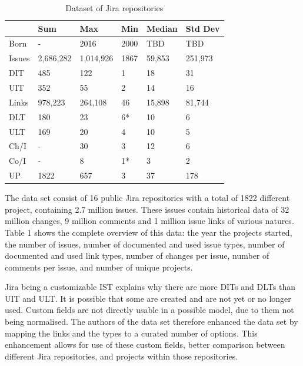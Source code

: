 \documentclass[sigconf]{acmart}
\begin{document}
\begin{table}[h!]
\caption{Dataset of Jira repositories}
\centering
 \begin{tabular}{l l l l l l} 
 \hline
   & Sum & Max & Min & Median & Std Dev \\ [0.5ex] 
 \hline\hline
 Born & - & 2016 & 2000 & TBD & TBD \\
 Issues & 2,686,282 & 1,014,926 & 1867 & 59,853 & 251,973 \\
 DIT & 485 & 122 & 1 & 18 & 31 \\
 UIT & 352 & 55 & 2 & 14 & 16 \\
 Links & 978,223 & 264,108 & 46 & 15,898 & 81,744 \\
 DLT & 180 & 23 & 6* & 10 & 6 \\
 ULT & 169 & 20 & 4 & 10 & 5 \\ 
 Ch/I & - & 30 & 3 & 12 & 6 \\
 Co/I & - & 8 & 1* & 3 & 2 \\
 UP & 1822 & 657 & 3 & 37 & 178 \\ [2ex] 
 \hline
 \end{tabular}
\end{table}

The data set consist of 16 public Jira repositories with a total of 1822 different project, containing 2.7 million issues. 
These issues contain historical data of 32 million changes, 9 million comments and 1 million issue links of various natures. 
Table 1 shows the complete overview of this data: the year the projects started, the number of issues, number of documented and used issue types, number of documented and used link types, number of changes per issue, number of comments per issue, and number of unique projects. 

Jira being a customizable IST explains why there are more DITs and DLTs than UIT and ULT. It is possible that some are created and are not yet or no longer used.
Custom fields are not directly usable in a possible model, due to them not being normalised.
The authors of the data set therefore enhanced the data set by mapping the links and the types to a curated number of options.
This enhancement allows for use of these custom fields, better comparison between different Jira repositories, and projects within those repositories.
\end{document}
